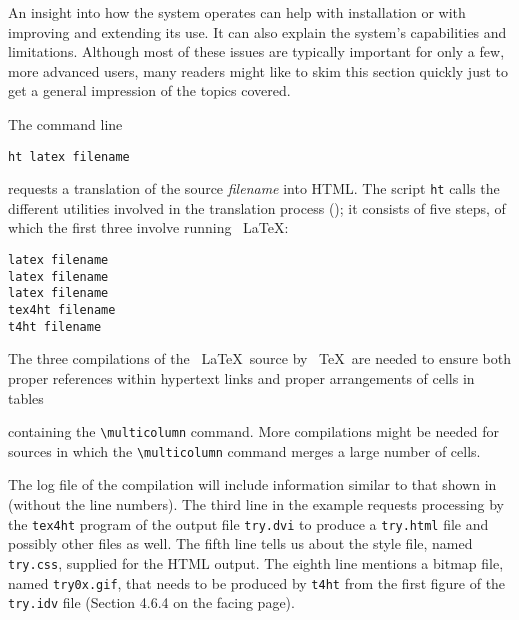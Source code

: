 

An insight into how the system operates can help with installation or
with improving and extending its use. It can also explain the system's
capabilities and limitations.  Although most of these issues are
typically important for only a few, more advanced users, many readers
might like to skim this section quickly just to get a general impression
of the topics covered. 


The command line 

\begin{verbatim}
ht latex filename 
\end{verbatim}
 

requests a translation of the source \emph{filename} into HTML. The script \verb|ht| calls the 
different utilities involved in the translation process (); it consists of five 
steps, of which the first three involve running \ \LaTeX: 

\begin{lstlisting}
latex filename
latex filename
latex filename
tex4ht filename
t4ht filename
\end{lstlisting}


The three compilations of the \ \LaTeX\  source by \ \TeX\  are needed to ensure both 
proper references within hypertext links and proper arrangements of cells in tables 
 
 
containing the \verb|\multicolumn| command. More compilations might be
needed for sources in which the \verb|\multicolumn| command merges a
large number of cells. 

The log file of the compilation will include information similar to that
shown in  (without the line numbers). The third line in the
example requests processing by the \verb|tex4ht| program of the output
file \verb|try.dvi| to produce a \verb|try.html| file and possibly other
files as well. The fifth line tells us about the style file, named
\verb|try.css|, supplied for the HTML output. The eighth line mentions a
bitmap file, named \verb|try0x.gif|, that needs to be produced by
\verb|t4ht| from the first figure of the \verb|try.idv| file (Section
4.6.4 on the facing page). 

